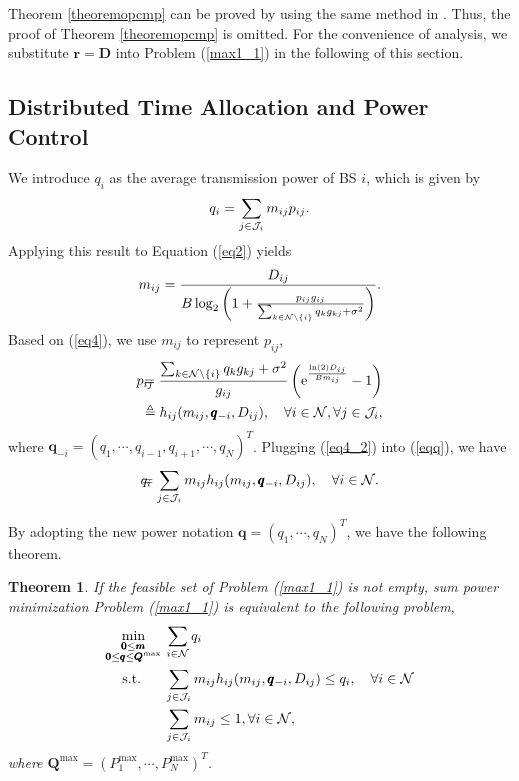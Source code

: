 \documentclass[journal]{IEEEtran}
\newtheorem{theorem}{Theorem}
\begin{document}
Theorem \ref{theoremopcmp} can be proved by using the same method in \cite[Lemma~2]{Chin2015Power}.
Thus, the proof of Theorem \ref{theoremopcmp} is omitted.
For the convenience of analysis,  we substitute $\pmb{r} = \pmb{D}$ into Problem (\ref{max1_1}) in the following of this section.
\subsection{Distributed Time Allocation and Power Control}
We introduce $q_i$ as the average transmission power of BS $i$, which is given by
\begin{equation}\label{eqq}
q_i=\sum_{j \in {\cal{J}}_i }m_{ij} p_{ij}.
\end{equation}
Applying this result to Equation (\ref{eq2}) yields
\begin{eqnarray}\label{eq4}
m_{ij}
=
\frac{D_{ij}}
{B\log_2\left(1+ \frac{p_{ij} g_{ij}} {\sum_{k \in {\cal{N}}\setminus \{i\}}  q_k g_{kj} +\sigma ^2} \right)}.
\end{eqnarray}
Based on (\ref{eq4}), we use $m_{ij}$ to represent $p_{ij}$,
\begin{eqnarray}\label{eq4_2}
p_{ij}&&\!\!\!\!\!\!\!\!\!\!
=\frac{\sum_{k \in {\cal{N}}\setminus \{i\}}  q_k g_{kj} +\sigma ^2}
{g_{ij}}
\left( \text e^{ \frac{\ln(2)D_{ij}} {B m_{ij}}  }-1
\right)
\nonumber\\
 &&\!\!\!\!\!\!\!\!\!\!
 \triangleq h_{ij}(m_{ij},\pmb{q}_{-i}, D_{ij}), \quad\forall i  \in {\cal{N}}, \forall j \in {\cal{J}}_i,
\end{eqnarray}
where $\pmb{q}_{-i}=(q_1, \cdots, q_{i-1}, q_{i+1}, \cdots, q_N)^T$.
Plugging (\ref{eq4_2}) into (\ref{eqq}), we have
\begin{eqnarray}\label{eq5}
q_{i}&&\!\!\!\!\!\!\!\!\!\!
=\sum_{j \in {\cal{J}}_i }
m_{ij} h_{ij}(m_{ij},\pmb{q}_{-i}, D_{ij}), \quad\forall i  \in {\cal{N}}.
\end{eqnarray}

By adopting the new power notation $\pmb q= (q_1, \cdots, q_N)^T$, we have the following theorem.

\begin{theorem}
If the feasible set of Problem (\ref{max1_1}) is not empty, sum power minimization Problem (\ref{max1_1}) is equivalent to the following problem,
\begin{subequations}\label{max1_2}
\begin{align}
\mathop{\min}_
{\substack{
\pmb{0} \leq \pmb{m}\\
\pmb{0} \leq \pmb{q} \leq \pmb{Q}^{\max}
}
}
\:
&\sum_{i \in {\cal{N}}} q_i
\\
\textrm{s.t.}\quad \:\:\:
& \sum_{j \in {\cal{J}}_i } m_{ij} h_{ij}(m_{ij},\pmb{q}_{-i}, D_{ij})\leq q_i,\quad \forall i  \in {\cal{N}}
\\
&\sum_{j \in {\cal{J}}_i } m_{ij} \leq 1, \forall i  \in {\cal{N}},
\end{align}
\end{subequations}
where $\pmb{Q}^{\max}=(P_1^{\max}, \cdots, P_N^{\max})^T$.
\end{theorem}
\end{document}
